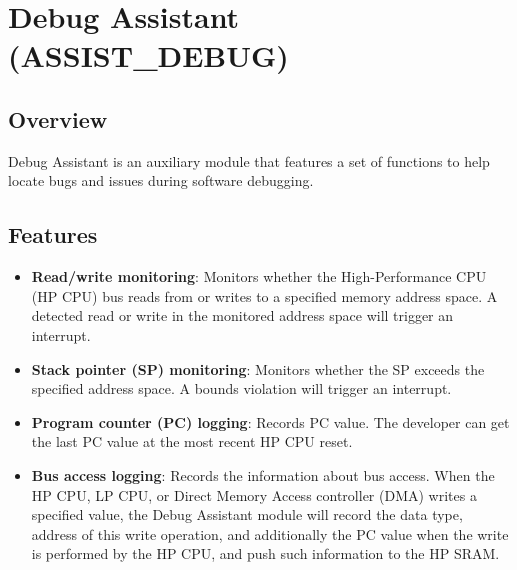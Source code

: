\documentclass[main\_\_EN.tex]{subfiles}
\begin{document}

\ifglobal
\else
    {\let\clearpage\relax \listoftodos}
    {\let\clearpage\relax \listofdonetodos}
    \tableofcontents
\fi











\chapter{Debug Assistant (ASSIST\_DEBUG)}
\label{mod:dbgassist}
\hypertarget{dbgassist}{}


\section{Overview}

Debug Assistant is an auxiliary module that features a set of functions to help locate bugs and issues during software debugging.

\section{Features}
\label{sec:dbgassist-features}

\begin{itemize}
    \item {\bfseries Read/write monitoring}: Monitors whether the High-Performance CPU (HP CPU) bus reads from or writes to a specified memory address space. A detected read or write in the monitored address space will trigger an interrupt.
    \item {\bfseries Stack pointer (SP) monitoring}: Monitors whether the SP exceeds the specified address space. A bounds violation will trigger an interrupt.
    \item {\bfseries Program counter (PC) logging}: Records PC value. The developer can get the last PC value at the most recent HP CPU reset.
    \item{\bfseries Bus access logging}: Records the information about bus access. When the HP CPU, LP CPU, or Direct Memory Access controller (DMA) writes a specified value, the Debug Assistant module will record the data type, address of this write operation, and additionally the PC value when the write is performed by the HP CPU, and push such information to the HP SRAM.
\end{itemize}
\end{document}
